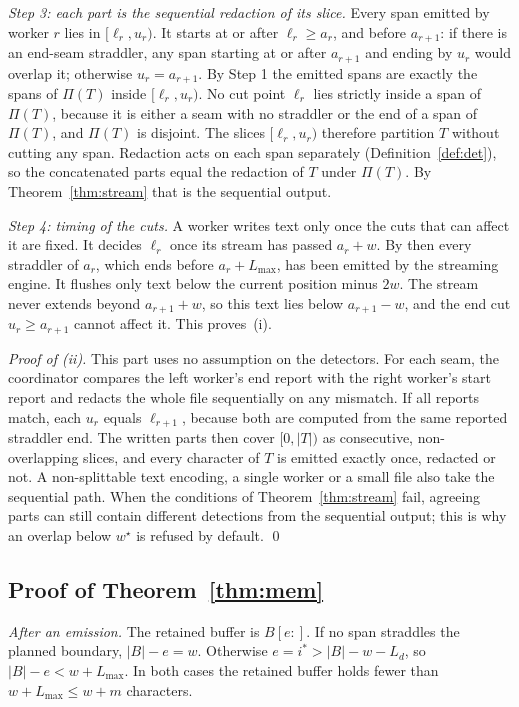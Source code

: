 \documentclass[pdflatex,sn-mathphys-num]{sn-jnl}
\theoremstyle{thmstyleone}
\theoremstyle{thmstylethree}
\begin{document}
\begin{appendices}
\emph{Step 3: each part is the sequential redaction of its slice.} Every span emitted by worker $r$ lies in $[\ell_r, u_r)$. It starts at or after $\ell_r \ge a_r$, and before $a_{r+1}$: if there is an end-seam straddler, any span starting at or after $a_{r+1}$ and ending by $u_r$ would overlap it; otherwise $u_r = a_{r+1}$. By Step 1 the emitted spans are exactly the spans of $\Pi(T)$ inside $[\ell_r, u_r)$. No cut point $\ell_r$ lies strictly inside a span of $\Pi(T)$, because it is either a seam with no straddler or the end of a span of $\Pi(T)$, and $\Pi(T)$ is disjoint. The slices $[\ell_r, u_r)$ therefore partition $T$ without cutting any span. Redaction acts on each span separately (Definition~\ref{def:det}), so the concatenated parts equal the redaction of $T$ under $\Pi(T)$. By Theorem~\ref{thm:stream} that is the sequential output.

\emph{Step 4: timing of the cuts.} A worker writes text only once the cuts that can affect it are fixed. It decides $\ell_r$ once its stream has passed $a_r + w$. By then every straddler of $a_r$, which ends before $a_r + L_{\max}$, has been emitted by the streaming engine. It flushes only text below the current position minus $2w$. The stream never extends beyond $a_{r+1} + w$, so this text lies below $a_{r+1} - w$, and the end cut $u_r \ge a_{r+1}$ cannot affect it. This proves~(i).

\emph{Proof of (ii).} This part uses no assumption on the detectors. For each seam, the coordinator compares the left worker's end report with the right worker's start report and redacts the whole file sequentially on any mismatch. If all reports match, each $u_r$ equals $\ell_{r+1}$, because both are computed from the same reported straddler end. The written parts then cover $[0, |T|)$ as consecutive, non-overlapping slices, and every character of $T$ is emitted exactly once, redacted or not. A non-splittable text encoding, a single worker or a small file also take the sequential path. When the conditions of Theorem~\ref{thm:stream} fail, agreeing parts can still contain different detections from the sequential output; this is why an overlap below $w^{\star}$ is refused by default.
\qed

\subsection{Proof of Theorem~\ref{thm:mem}}

\emph{After an emission.} The retained buffer is $B[e{:}]$. If no span straddles the planned boundary, $|B| - e = w$. Otherwise $e = i^{*} > |B| - w - L_d$, so $|B| - e < w + L_{\max}$. In both cases the retained buffer holds fewer than $w + L_{\max} \le w + m$ characters.


\end{appendices}
\end{document}
